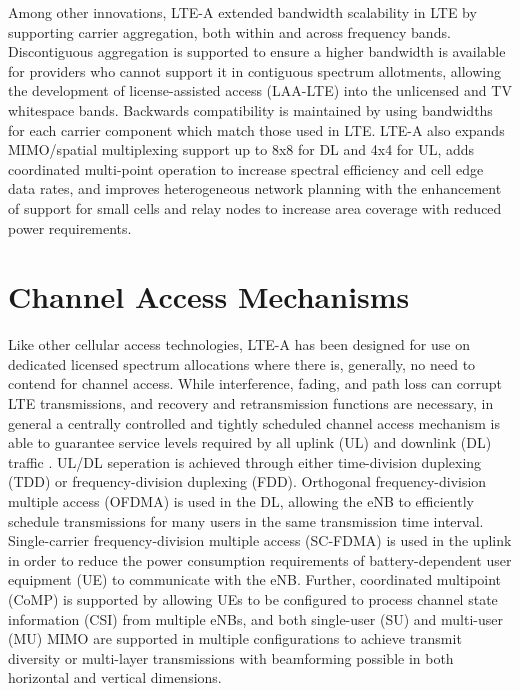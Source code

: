 Among other innovations, \mbox{LTE-A} extended bandwidth scalability in LTE by supporting carrier aggregation, both within and across frequency bands.   Discontiguous aggregation is supported to ensure a higher bandwidth is available for providers who cannot support it in contiguous spectrum allotments, allowing the development of license-assisted access (\mbox{LAA-LTE}) into the unlicensed and TV whitespace bands.  Backwards compatibility is maintained by using bandwidths for each carrier component which match those used in LTE.  \mbox{LTE-A} also expands MIMO/spatial multiplexing support up to 8x8 for DL and 4x4 for UL, adds coordinated multi-point operation to increase spectral efficiency and cell edge data rates, and improves heterogeneous network planning with the enhancement of support for small cells and relay nodes to increase area coverage with reduced power requirements.

\section{Channel Access Mechanisms}
\label{channel-access}
Like other cellular access technologies, \mbox{LTE-A} has been designed for use on dedicated licensed spectrum allocations where there is, generally, no need to contend for channel access.  While interference, fading, and path loss can corrupt LTE transmissions, and recovery and retransmission functions are necessary, in general a centrally controlled and tightly scheduled channel access mechanism is able to guarantee service levels required by all uplink (UL) and downlink (DL) traffic \cite{tr36300}. UL/DL seperation is achieved through either time-division duplexing (TDD) or frequency-division duplexing (FDD).  Orthogonal frequency-division multiple access (OFDMA) is used in the DL, allowing the eNB to efficiently schedule transmissions for many users in the same transmission time interval.  Single-carrier frequency-division multiple access (SC-FDMA) is used in the uplink in order to reduce the power consumption requirements of battery-dependent user equipment (UE) to communicate with the eNB.  Further, coordinated multipoint (CoMP) is supported by allowing UEs to be configured to process channel state information (CSI) from multiple eNBs, and both single-user (SU) and multi-user (MU) MIMO are supported in multiple configurations to achieve transmit diversity or multi-layer transmissions with beamforming possible in both horizontal and vertical dimensions.

